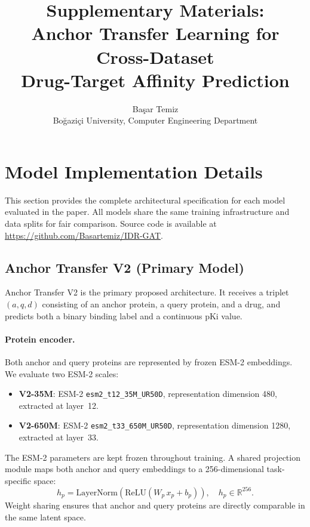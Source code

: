 \documentclass[11pt]{article}
\title{Supplementary Materials:\\Anchor Transfer Learning for Cross-Dataset\\Drug-Target Affinity Prediction}
\author{Ba\c{s}ar Temiz\\Bo\u{g}azi\c{c}i University, Computer Engineering Department}
\date{}
\begin{document}
\maketitle

\tableofcontents
\newpage

\section{Model Implementation Details}
\label{sec:model_details}

This section provides the complete architectural specification for each model evaluated in the paper. All models share the same training infrastructure and data splits for fair comparison. Source code is available at \url{https://github.com/Basartemiz/IDR-GAT}.

\subsection{Anchor Transfer V2 (Primary Model)}

Anchor Transfer V2 is the primary proposed architecture. It receives a triplet $(a, q, d)$ consisting of an anchor protein, a query protein, and a drug, and predicts both a binary binding label and a continuous pKi value.

\paragraph{Protein encoder.}
Both anchor and query proteins are represented by frozen ESM-2 embeddings. We evaluate two ESM-2 scales:
\begin{itemize}
    \item \textbf{V2-35M}: ESM-2 \texttt{esm2\_t12\_35M\_UR50D}, representation dimension 480, extracted at layer~12.
    \item \textbf{V2-650M}: ESM-2 \texttt{esm2\_t33\_650M\_UR50D}, representation dimension 1280, extracted at layer~33.
\end{itemize}
The ESM-2 parameters are kept frozen throughout training. A shared projection module maps both anchor and query embeddings to a 256-dimensional task-specific space:
\[
h_p = \mathrm{LayerNorm}\!\left(\mathrm{ReLU}\!\left(W_p\, x_p + b_p\right)\right), \quad h_p \in \mathbb{R}^{256}.
\]
Weight sharing ensures that anchor and query proteins are directly comparable in the same latent space.
\end{document}
